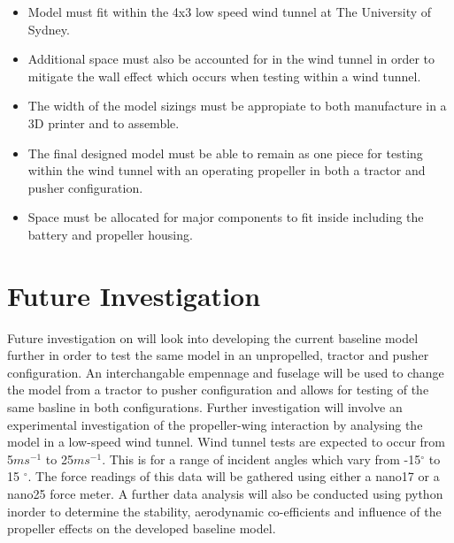 \begin{itemize}
    \item Model must fit within the 4x3 low speed wind tunnel at The University of Sydney.
    \item Additional space must also be accounted for in the wind tunnel in order to mitigate the wall effect which occurs when testing within a wind tunnel.
    \item The width of the model sizings must be appropiate to both manufacture in a 3D printer and to assemble.
    \item The final designed model must be able to remain as one piece for testing within the wind tunnel with an operating propeller in both a tractor and pusher configuration.
    \item Space must be allocated for major components to fit inside including the battery and propeller housing.
\end{itemize}





\section{Future Investigation}
\label{sec: Future Investigation}

Future investigation on will look into developing the current baseline model further in order to test the same model in an unpropelled, tractor and pusher configuration. An interchangable empennage and fuselage will be used to change the model from a tractor to pusher configuration and allows for testing of the same basline in both configurations. Further investigation will involve an experimental investigation of the propeller-wing interaction by analysing the model in a low-speed wind tunnel. Wind tunnel tests are expected to occur from 5$ms^{-1}$ to 25$ms^{-1}$. This is for a range of incident angles which vary from -15$^\circ$ to 15 $^\circ$. The force readings of this data will be gathered using either a nano17 or a nano25 force meter. A further data analysis will also be conducted using python inorder to determine the stability, aerodynamic co-efficients and influence of the propeller effects on the developed baseline model. 

